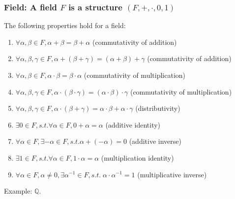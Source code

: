 \documentclass{beamer}
\begin{document}
\begin{frame}
	\frametitle{Field: A field $F$ is a structure $(F,+,\cdot,0,1 )$}
	The following properties hold for a field:
	\begin{enumerate}
		\item $\forall \alpha, \beta \in F, \alpha + \beta = \beta +\alpha$ (commutativity of addition)
		\item $\forall \alpha, \beta, \gamma \in F, \alpha + (\beta + \gamma) = (\alpha+\beta) + \gamma$ (commutativity of addition)
		\item $\forall \alpha, \beta \in F, \alpha \cdot \beta = \beta \cdot \alpha$ (commutativity of multiplication)
		\item $\forall \alpha, \beta, \gamma \in F, \alpha \cdot (\beta \cdot \gamma) = (\alpha\cdot\beta) \cdot \gamma$ (commutativity of multiplication)
		\item $\forall \alpha, \beta, \gamma \in F, \alpha \cdot (\beta + \gamma)= \alpha\cdot\beta + \alpha\cdot\gamma$ (distributivity)
		\item $\exists 0 \in F, s.t. \forall \alpha \in F, 0 + \alpha = \alpha$ (additive identity)
		\item $\forall \alpha \in F, \exists -\alpha \in F, s.t. \alpha+(-\alpha)=0$ (additive inverse)
		\item $\exists 1 \in F, s.t. \forall \alpha \in F, 1 \cdot \alpha = \alpha$ (multiplication identity)
		\item $\forall \alpha \in F, \alpha \neq 0, \exists \alpha^{-1} \in F, s.t. \; \alpha\cdot\alpha^{-1}=1$ (multiplicative inverse)
	\end{enumerate}
	Example: $\mathbb{Q}$.
\end{frame}
\end{document}
